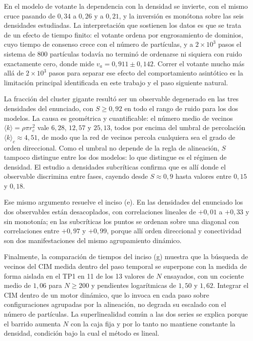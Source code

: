 \documentclass[11pt]{article}
\begin{document}
En el modelo de votante la dependencia con la densidad se invierte, con el mismo
cruce pasando de $0{,}34$ a $0{,}26$ y a $0{,}21$, y la inversión es monótona
sobre las seis densidades estudiadas. La interpretación que sostienen los datos
es que se trata de un efecto de tiempo finito: el votante ordena por
engrosamiento de dominios, cuyo tiempo de consenso crece con el número de
partículas, y a $2\times10^3$ pasos el sistema de 800 partículas todavía no
terminó de ordenarse ni siquiera con ruido exactamente cero, donde mide
$v_a = 0{,}911 \pm 0{,}142$. Correr el votante mucho más allá de $2\times10^3$
pasos para separar ese efecto del comportamiento asintótico es la limitación
principal identificada en este trabajo y el paso siguiente natural.

La fracción del cluster gigante resultó ser un observable degenerado en las tres
densidades del enunciado, con $S \geq 0{,}92$ en todo el rango de ruido para los
dos modelos. La causa es geométrica y cuantificable: el número medio de vecinos
$\langle k \rangle = \rho \pi r_c^2$ vale $6{,}28$, $12{,}57$ y $25{,}13$, todos
por encima del umbral de percolación $\langle k \rangle_c \approx 4{,}51$, de
modo que la red de vecinos percola cualquiera sea el grado de orden direccional.
Como el umbral no depende de la regla de alineación, $S$ tampoco distingue entre
los dos modelos: lo que distingue es el régimen de densidad. El estudio a
densidades subcríticas confirma que es allí donde el observable discrimina entre
fases, cayendo desde $S \approx 0{,}9$ hasta valores entre $0{,}15$ y $0{,}18$.

Ese mismo argumento resuelve el inciso (e). En las densidades del enunciado los
dos observables están desacoplados, con correlaciones lineales de $+0{,}01$ a
$+0{,}33$ y sin monotonía; en las subcríticas los puntos se ordenan sobre una
diagonal con correlaciones entre $+0{,}97$ y $+0{,}99$, porque allí orden
direccional y conectividad son dos manifestaciones del mismo agrupamiento
dinámico.

Finalmente, la comparación de tiempos del inciso (g) muestra que la búsqueda de
vecinos del CIM medida dentro del paso temporal se superpone con la medida de
forma aislada en el TP1 en 11 de los 13 valores de $N$ ensayados, con un
cociente medio de $1{,}06$ para $N \geq 200$ y pendientes logarítmicas de
$1{,}50$ y $1{,}62$. Integrar el CIM dentro de un motor dinámico, que lo invoca
en cada paso sobre configuraciones agrupadas por la alineación, no degrada su
escalado con el número de partículas. La superlinealidad común a las dos series
se explica porque el barrido aumenta $N$ con la caja fija y por lo tanto no
mantiene constante la densidad, condición bajo la cual el método es lineal.
\end{document}
